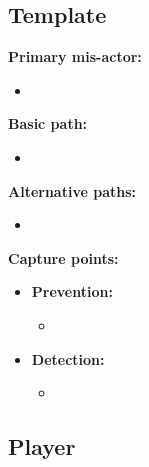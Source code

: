 \documentclass[a4paper,11pt]{report}
\begin{document}
\subsection{Template}
\textbf{Primary mis-actor:}
\begin{itemize}
\item 
\end{itemize}
\textbf{Basic path:}
\begin{itemize}
\item 
\end{itemize}
\textbf{Alternative paths:}
\begin{itemize}
\item 
\end{itemize}
\textbf{Capture points:}
\begin{itemize}
\item \textbf{Prevention:}
\begin{itemize}
\item 
\end{itemize}
\item \textbf{Detection:}
\begin{itemize}
\item 
\end{itemize}
\end{itemize}

\subsection{Player}
\end{document}
